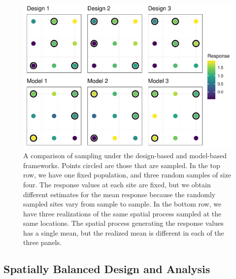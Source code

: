 \documentclass[]{elsarticle} %
\begin{document}
\begin{figure}
\includegraphics[width=1\linewidth]{manuscript_files/figure-latex/fig1-1} \caption{A comparison of sampling under the design-based and model-based frameworks. Points circled are those that are sampled. In the top row, we have one fixed population, and three random samples of size four. The response values at each site are fixed, but we obtain different estimates for the mean response because the randomly sampled sites vary from sample to sample. In the bottom row, we have three realizations of the same spatial process sampled at the same locations. The spatial process generating the response values has a single mean, but the realized mean is different in each of the three panels.}\label{fig:fig1}
\end{figure}

\hypertarget{subsec:spb_design}{%
\subsection{Spatially Balanced Design and
Analysis}\label{subsec:spb_design}}
\end{document}
